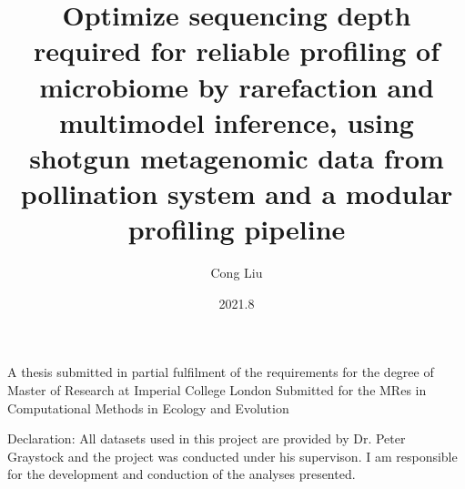 \documentclass[11pt]{article}
\title{Optimize sequencing depth required for reliable profiling of microbiome by rarefaction and multimodel inference, using shotgun metagenomic data from pollination system and a modular profiling pipeline}
\author{Cong Liu}
\date{2021.8}
\begin{document}


  \maketitle
  \vspace*{\fill}
  \begin{center}
    A thesis submitted in partial fulfilment of the requirements for the degree of Master of Research at Imperial College London
\newline
Submitted for the MRes in Computational Methods in Ecology and Evolution
  \end{center}

  \newpage
  Declaration:
  \newline
  All datasets used in this project are provided by Dr. Peter Graystock and the project was conducted under his supervison. 
  I am responsible for the development and conduction of the analyses presented.
\end{document}

